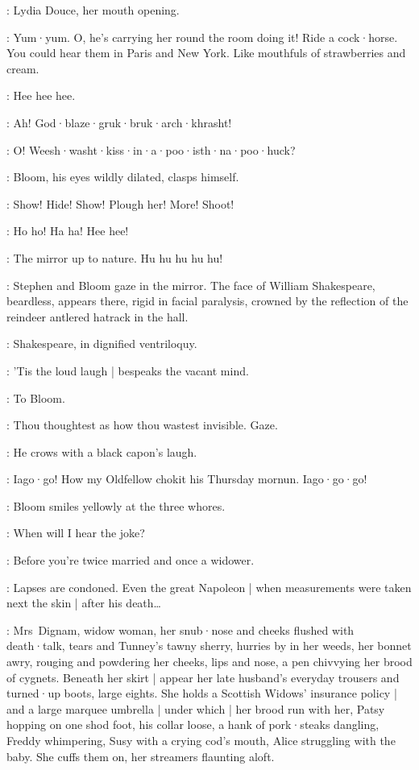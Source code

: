 :
Lydia Douce,
her mouth opening.

\LydiaDouce:
Yum·yum.
O,
he's carrying her round the room doing it!
Ride a cock·horse.
You could hear them in Paris and New York.
Like mouthfuls of strawberries and cream.

\Kitty:
Hee hee hee.

\BoylansVoice:
Ah!
God·blaze·gruk·bruk·arch·khrasht!%

\MarionsVoice:
O!
Weesh·washt·kiss·in·a·poo·isth·na·poo·huck?

:
Bloom,
his eyes wildly dilated,
clasps himself.

\Bloom:
Show!
Hide!
Show!
Plough her!
More!
Shoot!

\BellaZoeFlorryKitty:
Ho ho!
Ha ha!
Hee hee!

\Lynch:
The mirror up to nature.
%
Hu hu hu hu hu!

:
Stephen and Bloom gaze in the mirror.
The face of William Shakespeare,
beardless,
appears there,
rigid in facial paralysis,
crowned by the reflection of the reindeer antlered hatrack in the hall.

:
Shakespeare,
in dignified ventriloquy.

\Shakespeare:
'Tis the loud laugh |
bespeaks the vacant mind.

:
To Bloom.

\Shakespeare:
Thou thoughtest as how thou wastest invisible.
Gaze.

:
He crows with a black capon's laugh.

\Shakespeare:
Iago·go!
How my Oldfellow chokit his Thursday mornun.
Iago·go·go!

:
Bloom smiles yellowly at the three whores.

\Bloom:
When will I hear the joke?

\Zoe:
Before you're twice married and once a widower.

\Bloom:
Lapses are condoned.
Even the great Napoleon |
when measurements were taken next the skin |
after his death…

:
Mrs~Dignam,
widow woman,
her snub·nose and cheeks flushed with death·talk,
tears and Tunney's tawny sherry,
hurries by in her weeds,
her bonnet awry,
rouging and powdering her cheeks,
lips and nose,
a pen chivvying her brood of cygnets.
%
Beneath her skirt |
appear her late husband's everyday trousers and turned·up boots,
large eights.
She holds a Scottish Widows' insurance policy |
and a large marquee umbrella |
under which |
her brood run with her,
Patsy hopping on one shod foot,
his collar loose,
a hank of pork·steaks dangling,
Freddy whimpering,
Susy with a crying cod's mouth,
Alice struggling with the baby.
She cuffs them on,
her streamers flaunting aloft.

